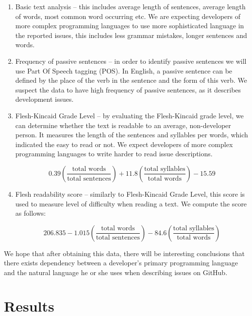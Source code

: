 \documentclass[]{article}
\begin{document}
\begin{enumerate}
    \item Basic text analysis -- this includes average length of sentences, average length of words, most common word occurring etc. We are expecting developers of more complex programming languages to use more sophisticated language in the reported issues, this includes less grammar mistakes, longer sentences and words.

    \item Frequency of passive sentences -- in order to identify passive sentences we will use Part Of Speech tagging (POS). In English, a passive sentence can be defined by the place of the verb in the sentence and the form of this verb. We suspect the data to have high frequency of passive sentences, as it describes development issues.

    \item Flesh-Kincaid Grade Level -- by evaluating the Flesh-Kincaid grade level, we can determine whether the text is readable to an average, non-developer person. It measures the length of the sentences and syllables per words, which indicated the easy to read or not. We expect developers of more complex programming languages to write harder to read issue descriptions.

          \[0.39\left(\frac{\text{total words}}{\text{total sentences}}\right) + 11.8\left(\frac{\text{total syllables}}{\text{total words}}\right) - 15.59\]

    \item Flesh readability score -- similarly to Flesh-Kincaid Grade Level, this score is used to measure level of difficulty when reading a text. We compute the score as follows:

          \[206.835 - 1.015\left(\frac{\text{total words}}{\text{total sentences}}\right) - 84.6\left(\frac{\text{total syllables}}{\text{total words}}\right)\]
\end{enumerate}

We hope that after obtaining this data, there will be interesting conclusions that there exists dependency between a developer's primary programming language and the natural language he or she uses when describing issues on GitHub.

\section{Results}
\end{document}
